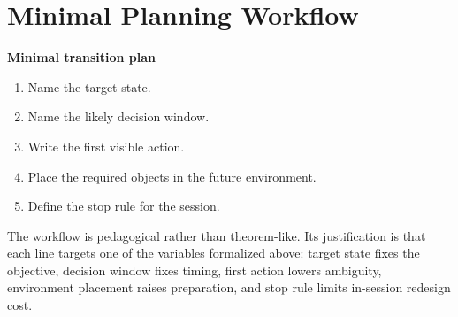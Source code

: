 \section{Minimal Planning Workflow}

\begin{templatebox}
\textbf{Minimal transition plan}
\begin{enumerate}[nosep]
  \item Name the target state.
  \item Name the likely decision window.
  \item Write the first visible action.
  \item Place the required objects in the future environment.
  \item Define the stop rule for the session.
\end{enumerate}
\end{templatebox}

\begin{remark}
The workflow is pedagogical rather than theorem-like. Its justification is that
each line targets one of the variables formalized above: target state fixes the
objective, decision window fixes timing, first action lowers ambiguity,
environment placement raises preparation, and stop rule limits in-session
redesign cost.
\end{remark}

